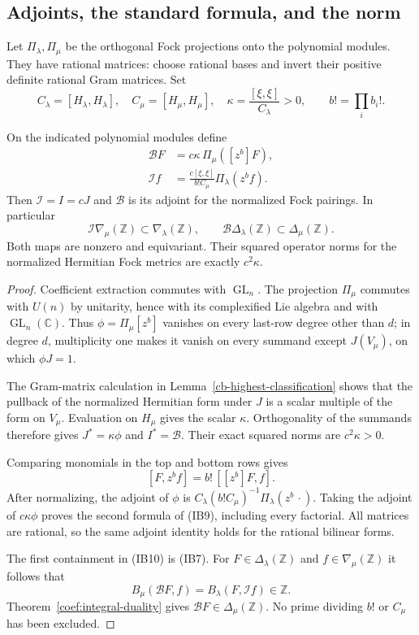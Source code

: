 \subsection{Adjoints, the standard formula, and the norm}

Let $\Pi_\lambda,\Pi_\mu$ be the orthogonal Fock
projections onto the polynomial modules.  They have
rational matrices: choose rational bases and invert
their positive definite rational Gram matrices.
Set
\[
 C_\lambda=[H_\lambda,H_\lambda],\quad
 C_\mu=[H_\mu,H_\mu],\quad
 \kappa=\frac{[\xi,\xi]}{C_\lambda}>0,\qquad b!=\prod_i b_i!.
 \tag{IB8}
\]

\begin{theorem}\label{ib-standard-integral}
On the indicated polynomial modules define
\[
 \begin{split}
 \mathcal B F&=c\kappa\,\Pi_\mu([z^b]F),\\
 \mathcal I f&=\frac{c[\xi,\xi]}{b!C_\mu}\Pi_\lambda(z^b f).
 \end{split}
 \tag{IB9}
\]
Then $\mathcal I=I=cJ$ and $\mathcal B$ is its adjoint
for the normalized Fock pairings.  In particular
\[
 \mathcal I\nabla_\mu(\mathbb Z)\subset\nabla_\lambda(\mathbb Z),
 \qquad
 \mathcal B\Delta_\lambda(\mathbb Z)\subset\Delta_\mu(\mathbb Z).
 \tag{IB10}
\]
Both maps are nonzero and equivariant.  Their squared
operator norms for the normalized Hermitian Fock
metrics are exactly $c^2\kappa$.
\end{theorem}
\begin{proof}
Coefficient extraction commutes with $\operatorname{GL}_n$.
The projection $\Pi_\mu$ commutes with $U(n)$ by
unitarity, hence with its complexified Lie algebra
and with $\operatorname{GL}_n(\mathbb C)$.
Thus $\phi=\Pi_\mu[z^b]$ vanishes on every last-row
degree other than $d$; in degree $d$, multiplicity
one makes it vanish on every summand except
$J(V_\mu)$, on which $\phi J=1$.

The Gram-matrix calculation in
Lemma~\ref{cb-highest-classification} shows that the
pullback of the normalized Hermitian form under $J$
is a scalar multiple of the form on $V_\mu$.
Evaluation on $H_\mu$ gives the scalar $\kappa$.
Orthogonality of the summands therefore gives
$J^*=\kappa\phi$ and $I^*=\mathcal B$.
Their exact squared norms are $c^2\kappa>0$.

Comparing monomials in the top and bottom rows gives
\[
                         [F,z^b f]=b!\,[[z^b]F,f].
\]
After normalizing, the adjoint of $\phi$ is
$C_\lambda(b!C_\mu)^{-1}\Pi_\lambda(z^b\,\cdot)$.
Taking the adjoint of $c\kappa\phi$ proves the second
formula of (IB9), including every factorial.
All matrices are rational, so the same adjoint
identity holds for the rational bilinear forms.

The first containment in (IB10) is (IB7).
For $F\in\Delta_\lambda(\mathbb Z)$ and
$f\in\nabla_\mu(\mathbb Z)$ it follows that
\[
 B_\mu(\mathcal B F,f)=B_\lambda(F,\mathcal I f)\in\mathbb Z.
\]
Theorem~\ref{coef:integral-duality} gives
$\mathcal B F\in\Delta_\mu(\mathbb Z)$.
No prime dividing $b!$ or $C_\mu$ has been excluded.
\end{proof}

